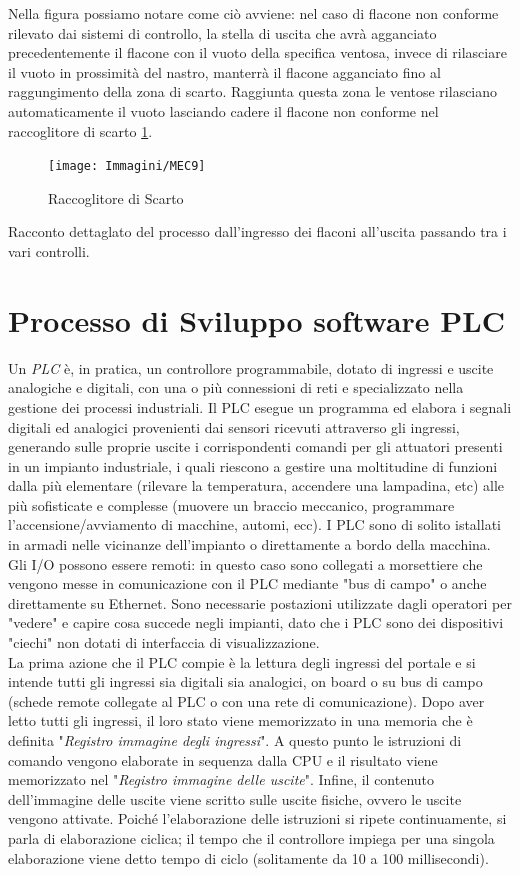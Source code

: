 \documentclass[12pt, a4paper, oneside]{book}
\begin{document}
Nella figura possiamo notare come ciò avviene: nel caso di flacone non conforme rilevato dai sistemi di controllo, la stella di uscita che avrà agganciato precedentemente il flacone con il vuoto della specifica ventosa, invece di rilasciare il vuoto in prossimità del nastro, manterrà il flacone agganciato fino al raggungimento della zona di scarto. Raggiunta questa zona le ventose rilasciano automaticamente il vuoto lasciando cadere il flacone non conforme nel raccoglitore di scarto \ref{mec9}. 

\begin{figure}[H]
	\centering
	\texttt{[image: Immagini/MEC9]}
	\label{mec9}
	\caption{ Raccoglitore di Scarto}
\end{figure}
 
Racconto dettaglato del processo dall'ingresso dei flaconi all'uscita passando tra i vari controlli.
\chapter{Processo di Sviluppo software PLC}
Un \textit{PLC} è, in pratica, un controllore programmabile, dotato di ingressi e uscite analogiche e digitali, con una o più connessioni di reti e specializzato nella gestione dei processi industriali. Il PLC esegue un programma ed elabora i segnali digitali ed analogici provenienti dai sensori ricevuti attraverso gli ingressi, generando sulle proprie uscite i corrispondenti comandi per gli attuatori presenti in un impianto industriale, i quali riescono a gestire una moltitudine di funzioni dalla più elementare (rilevare la temperatura, accendere una lampadina, etc) alle più sofisticate e complesse (muovere un braccio meccanico, programmare l’accensione/avviamento di macchine, automi, ecc). 
I PLC sono di solito istallati in armadi nelle vicinanze dell'impianto o direttamente a bordo della macchina. Gli I/O possono essere remoti: in questo caso sono collegati a morsettiere che vengono messe in comunicazione con il PLC mediante "bus di campo" o anche direttamente su Ethernet. Sono necessarie postazioni utilizzate dagli operatori per "vedere" e capire cosa succede negli impianti, dato che i PLC sono dei dispositivi "ciechi" non dotati di interfaccia di visualizzazione.
\\La prima azione che il PLC compie è la lettura degli ingressi del portale e si intende tutti gli ingressi sia digitali sia analogici, on board o su bus di campo (schede remote collegate al PLC o con una rete di comunicazione). Dopo aver letto tutti gli ingressi, il loro stato viene memorizzato in una memoria che è definita "\textit{Registro immagine degli ingressi}". A questo punto le istruzioni di comando vengono elaborate in sequenza dalla CPU e il risultato viene memorizzato nel "\textit{Registro immagine delle uscite}". Infine, il contenuto dell'immagine delle uscite viene scritto sulle uscite fisiche, ovvero le uscite vengono attivate. Poiché l'elaborazione delle istruzioni si ripete continuamente, si parla di elaborazione ciclica; il tempo che il controllore impiega per una singola elaborazione viene detto tempo di ciclo (solitamente da 10 a 100 millisecondi).
\end{document}
